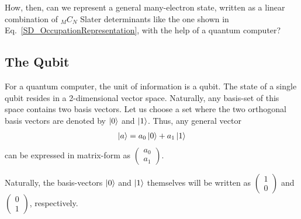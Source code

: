 \documentclass[12pt,oneside]{book}
\begin{document}
How, then, can we represent a general many-electron state, written as a linear combination of $_MC_N$ Slater determinants like the one shown in Eq.~\ref{SD_OccupationRepresentation}, with the help of a quantum computer? %




    
    

\subsection*{The Qubit}

For a quantum computer, the unit of information is a qubit. The state of a single qubit resides in a 2-dimensional vector space. Naturally, any basis-set of this space contains two basis vectors. Let us choose a set where the two orthogonal basis vectors are denoted by $\ket{0}$ and $\ket{1}$. Thus, any general vector 
\begin{align}\label{Eq1}
    \ket{a}=a_0\ket{0}+a_1\ket{1}
\end{align}
can be expressed in matrix-form as $\begin{pmatrix}
        a_0\\
        a_1
    \end{pmatrix}$.

Naturally, the basis-vectors $\ket{0}$ and $\ket{1}$ themselves will be written as
$\begin{pmatrix}
        1\\
        0
    \end{pmatrix}$ and $\begin{pmatrix}
        0\\
        1
    \end{pmatrix}$, respectively.
\end{document}
